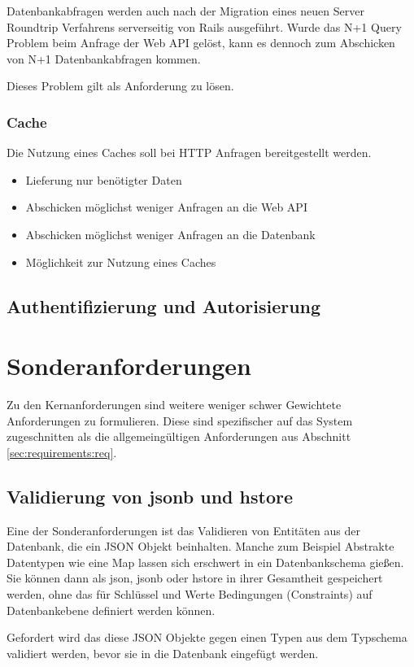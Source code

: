 Datenbankabfragen werden auch nach der Migration eines neuen Server Roundtrip Verfahrens serverseitig von Rails ausgeführt. Wurde das N+1 Query Problem beim Anfrage der Web API gelöst, kann es dennoch zum Abschicken von N+1 Datenbankabfragen kommen.

Dieses Problem gilt als Anforderung zu lösen.

\subsubsection{Cache}
Die Nutzung eines Caches soll bei HTTP Anfragen bereitgestellt werden.


\begin{itemize}
	\setlength\itemsep{-1em}
	\item Lieferung nur benötigter Daten
	\item Abschicken möglichst weniger Anfragen an die Web API
	\item Abschicken möglichst weniger Anfragen an die Datenbank
	\item Möglichkeit zur Nutzung eines Caches
\end{itemize}


\subsection{Authentifizierung und Autorisierung}

\section{Sonderanforderungen}
Zu den Kernanforderungen sind weitere weniger schwer Gewichtete Anforderungen zu formulieren.
Diese sind spezifischer auf das System zugeschnitten als die allgemeingültigen Anforderungen aus Abschnitt \ref{sec:requirements:req}.

\subsection{Validierung von jsonb und hstore}
Eine der Sonderanforderungen ist das Validieren von Entitäten aus der Datenbank, die ein JSON Objekt beinhalten.
Manche zum Beispiel Abstrakte Datentypen wie eine Map lassen sich erschwert in ein Datenbankschema gießen. Sie können dann als json,
jsonb oder hstore in ihrer Gesamtheit gespeichert werden, ohne das für Schlüssel und Werte Bedingungen (Constraints) auf Datenbankebene definiert werden können.

Gefordert wird das diese JSON Objekte gegen einen Typen aus dem Typschema validiert werden, bevor sie in die Datenbank eingefügt werden.

